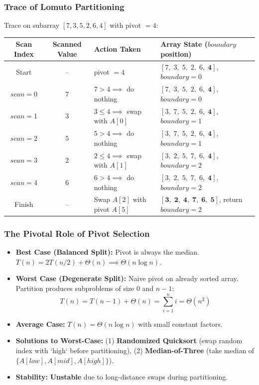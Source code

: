 \documentclass[11pt,a4paper]{article}
\begin{document}
\subsubsection{Trace of Lomuto Partitioning}
Trace on subarray $[7, 3, 5, 2, 6, 4]$ with pivot $= 4$:
\begin{center}
\begin{tabular}{c c l p{6.5cm}}
\toprule
\textbf{Scan Index} & \textbf{Scanned Value} & \textbf{Action Taken} & \textbf{Array State ($boundary$ position)} \\
\midrule
Start & -- & pivot $= 4$ & $[7,\; 3,\; 5,\; 2,\; 6,\; \mathbf{4}]$, $boundary = 0$ \\
$scan = 0$ & $7$ & $7 > 4 \implies$ do nothing & $[7,\; 3,\; 5,\; 2,\; 6,\; \mathbf{4}]$, $boundary = 0$ \\
$scan = 1$ & $3$ & $3 \le 4 \implies$ swap with $A[0]$ & $[3,\; 7,\; 5,\; 2,\; 6,\; \mathbf{4}]$, $boundary = 1$ \\
$scan = 2$ & $5$ & $5 > 4 \implies$ do nothing & $[3,\; 7,\; 5,\; 2,\; 6,\; \mathbf{4}]$, $boundary = 1$ \\
$scan = 3$ & $2$ & $2 \le 4 \implies$ swap with $A[1]$ & $[3,\; 2,\; 5,\; 7,\; 6,\; \mathbf{4}]$, $boundary = 2$ \\
$scan = 4$ & $6$ & $6 > 4 \implies$ do nothing & $[3,\; 2,\; 5,\; 7,\; 6,\; \mathbf{4}]$, $boundary = 2$ \\
Finish & -- & Swap $A[2]$ with pivot $A[5]$ & $[\mathbf{3},\; \mathbf{2},\; \mathbf{4},\; \mathbf{7},\; \mathbf{6},\; \mathbf{5}]$, return $boundary = 2$ \\
\bottomrule
\end{tabular}
\end{center}

\subsubsection{The Pivotal Role of Pivot Selection}
\begin{itemize}[itemsep=2pt]
    \item \textbf{Best Case (Balanced Split):} Pivot is always the median. $T(n) = 2T(n/2) + \Theta(n) \implies \Theta(n \log n)$.
    \item \textbf{Worst Case (Degenerate Split):} Naive pivot on already sorted array. Partition produces subproblems of size $0$ and $n-1$:
    \[
    T(n) = T(n - 1) + \Theta(n) = \sum_{i=1}^n i = \Theta(n^2)
    \]
    \item \textbf{Average Case:} $T(n) = \Theta(n \log n)$ with small constant factors.
    \item \textbf{Solutions to Worst-Case:} (1) \textbf{Randomized Quicksort} (swap random index with `high` before partitioning), (2) \textbf{Median-of-Three} (take median of $\{A[low], A[mid], A[high]\}$).
    \item \textbf{Stability:} \textbf{Unstable} due to long-distance swaps during partitioning.
\end{itemize}
\end{document}
